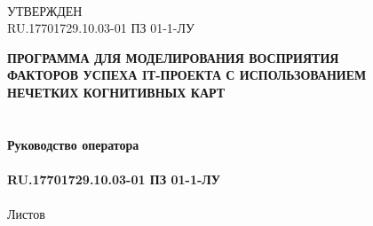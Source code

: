 \documentclass{article}
\begin{document}
    \newpage
    \clearpage
    \begin{textbf}
        \\
        УТВЕРЖДЕН\\
        RU.17701729.10.03-01 ПЗ 01-1-ЛУ\\
    \end{textbf}
    \bigskip
    \begin{center}
        \topskip=0pt
        \vspace*{\fill}
        \textbf{ПРОГРАММА ДЛЯ МОДЕЛИРОВАНИЯ ВОСПРИЯТИЯ\\
        ФАКТОРОВ УСПЕХА IТ-ПРОЕКТА С ИСПОЛЬЗОВАНИЕМ\\
        НЕЧЕТКИХ КОГНИТИВНЫХ КАРТ\\
        ~\\
        ~\\
        Руководство оператора\\
        ~\\
        RU.17701729.10.03-01 ПЗ 01-1-ЛУ}\\
        ~\\
        Листов \ztotpages\\
        \vspace*{\fill}
    \end{center}
    \begin{center}
    \end{center}
    \newpage
    \tableofcontents
    \newpage
\end{document}
